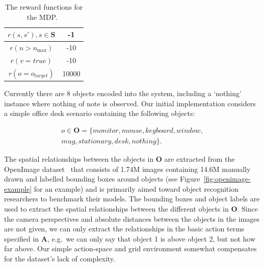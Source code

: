\documentclass[a4paper, twoside]{article}
\begin{document}
\begin{table}
  \centering
  \caption{The reward functions for the MDP.\ }\label{tab:rewards}
  \begin{tabular}{cc}
    \toprule
    $r(s, s'), s\in\mathbf{S}$ & -1  \\ \midrule
    $r(n > n_{\max})$ & -10 \\ \midrule
    $r(v = true)$  & -10 \\ \midrule
    $r(o = o_{target})$ & 10000 \\ \midrule
    \bottomrule
  \end{tabular}
\end{table}

Currently there are 8 objects encoded into the system, including a `nothing' instance where nothing of note is observed. Our initial implementation considers a simple office desk scenario containing the following objects:

\begin{equation}
  \begin{aligned}
    o\in \mathbf{O} = \{monitor, mouse, keyboard, window,\\mug, stationary, desk, nothing\}.
  \end{aligned}
\end{equation}

The spatial relationships between the objects in $\mathbf{O}$ are extracted from the OpenImage dataset~\cite{openimages} that consists of 1.74M images containing 14.6M manually drawn and labelled bounding boxes around objects (see Figure~\ref{fig:openimage-example} for an example) and is primarily aimed toward object recognition researchers to benchmark their models. The bounding boxes and object labels are used to extract the spatial relationships between the different objects in $\mathbf{O}$. Since the camera perspectives and absolute distances between the objects in the images are not given, we can only extract the relationships in the basic action terms specified in $\mathbf{A}$, e.g.\ we can only say that object 1 is above object 2, but not how far above. Our simple action-space and grid environment somewhat compensates for the dataset's lack of complexity. 
\end{document}

